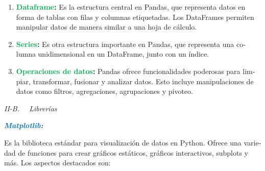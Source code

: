 \documentclass[letterpaper]{article}
\begin{document}
\begin{multicols}{2}
\bigskip

\begin{enumerate}[series=listWWNumiv,label=\Roman*.,ref=\Roman*]
\item {
\foreignlanguage{spanish}{\textbf{\textcolor[HTML]{00B050}{Dataframe}}}\foreignlanguage{spanish}{\textbf{:}}\foreignlanguage{spanish}{
Es la estructura central en Pandas, que representa datos en forma de tablas con filas y columnas etiquetadas. Los
DataFrames permiten manipular datos de manera similar a una hoja de cálculo.}}
\item {
\foreignlanguage{spanish}{\textbf{\textcolor[HTML]{00B050}{Series}}}\foreignlanguage{spanish}{\textbf{:}}\foreignlanguage{spanish}{
Es otra estructura importante en Pandas, que representa una columna unidimensional en un DataFrame, junto con un
índice.}}
\item {
\foreignlanguage{spanish}{\textbf{\textcolor[HTML]{00B050}{Operaciones de
datos}}}\foreignlanguage{spanish}{\textbf{:}}\foreignlanguage{spanish}{ Pandas ofrece funcionalidades poderosas para
limpiar, transformar, fusionar y analizar datos. Esto incluye manipulaciones de datos como filtros, agregaciones,
agrupaciones y pivoteo.}}
\end{enumerate}

\bigskip


\bigskip


\bigskip


\bigskip


\bigskip


\bigskip


\bigskip


\bigskip


\bigskip


\bigskip

{
\textit{II-B. \ \ Librerías}}

{
\foreignlanguage{spanish}{\textbf{\textit{\textcolor[HTML]{0070C0}{Matplotlib}}}}\foreignlanguage{spanish}{\textbf{\textit{:}}}}

{
\foreignlanguage{spanish}{Es la biblioteca estándar para visualización de datos en Python. Ofrece una variedad de
funciones para crear gráficos estáticos, gráficos interactivos, subplots y más. }Los aspectos destacados son:}


\bigskip


\end{multicols}
\end{document}
